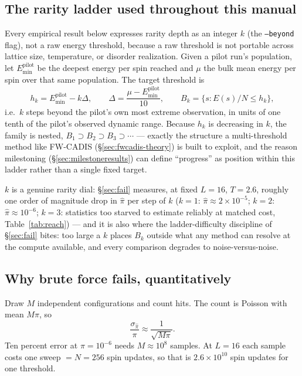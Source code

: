 \documentclass[11pt,a4paper]{article}
\begin{document}
\subsection{The rarity ladder used throughout this manual}\label{sec:beyond}
Every empirical result below expresses rarity depth as an integer $k$ (the
\texttt{--beyond} flag), not a raw energy threshold, because a raw threshold is not portable
across lattice size, temperature, or disorder realization. Given a pilot run's population, let
$E^{\text{pilot}}_{\min}$ be the deepest energy per spin reached and $\mu$ the bulk mean energy
per spin over that same population. The target threshold is
\begin{equation}\label{eq:beyond}
h_k = E^{\text{pilot}}_{\min} - k\Delta,\qquad
\Delta=\frac{\mu-E^{\text{pilot}}_{\min}}{10},\qquad
B_k=\{s: E(s)/N \le h_k\},
\end{equation}
i.e.\ $k$ steps beyond the pilot's own most extreme observation, in units of one tenth of the
pilot's observed dynamic range. Because $h_k$ is decreasing in $k$, the family is nested,
$B_1\supset B_2\supset B_3\supset\cdots$ --- exactly the structure a multi-threshold method like
FW-CADIS (\S\ref{sec:fwcadis-theory}) is built to exploit, and the reason milestoning
(\S\ref{sec:milestoneresults}) can define ``progress'' as position within this ladder rather than a
single fixed target.

$k$ is a genuine rarity dial: \S\ref{sec:fail} measures, at fixed $L=16$, $T=2.6$, roughly one
order of magnitude drop in $\hat\pi$ per step of $k$ ($k=1$: $\hat\pi\!\approx\!2\times10^{-5}$;
$k=2$: $\hat\pi\!\approx\!10^{-6}$; $k=3$: statistics too starved to estimate reliably at
matched cost, Table~\ref{tab:reach}) --- and it is also where the ladder-difficulty discipline of
\S\ref{sec:fail} bites: too large a $k$ places $B_k$ outside what any method can resolve at
the compute available, and every comparison degrades to noise-versus-noise.

\subsection{Why brute force fails, quantitatively}
Draw $M$ independent configurations and count hits. The count is Poisson with mean $M\pi$, so
\begin{equation}\label{eq:poisson}
\frac{\sigma_{\hat\pi}}{\pi}\approx\frac{1}{\sqrt{M\pi}}.
\end{equation}
Ten percent error at $\pi=10^{-6}$ needs $M\approx10^{8}$ samples. At $L=16$ each sample costs one
sweep $=N=256$ spin updates, so that is $2.6\times10^{10}$ spin updates for one threshold.
\end{document}
